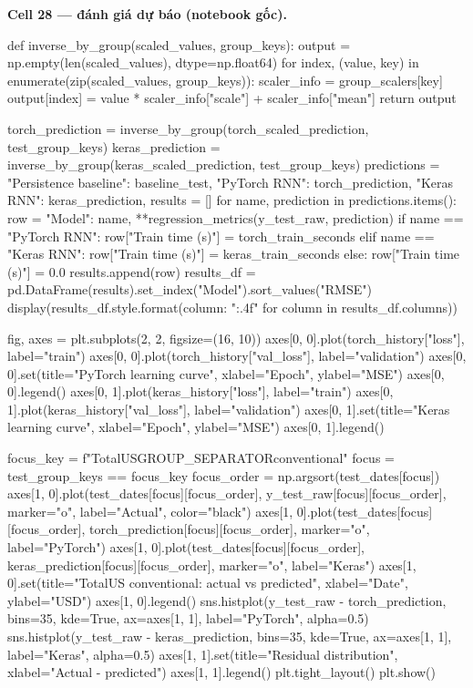 \documentclass[12pt,a4paper]{report}
\begin{document}
\par\medskip\noindent\textbf{Cell 28 --- đánh giá dự báo (notebook gốc).}
\begin{NotebookCode}
def inverse_by_group(scaled_values, group_keys):
    output = np.empty(len(scaled_values), dtype=np.float64)
    for index, (value, key) in enumerate(zip(scaled_values, group_keys)):
        scaler_info = group_scalers[key]
        output[index] = value * scaler_info["scale"] + scaler_info["mean"]
    return output

torch_prediction = inverse_by_group(torch_scaled_prediction, test_group_keys)
keras_prediction = inverse_by_group(keras_scaled_prediction, test_group_keys)
predictions = {
    "Persistence baseline": baseline_test,
    "PyTorch RNN": torch_prediction,
    "Keras RNN": keras_prediction,
}
results = []
for name, prediction in predictions.items():
    row = {"Model": name, **regression_metrics(y_test_raw, prediction)}
    if name == "PyTorch RNN":
        row["Train time (s)"] = torch_train_seconds
    elif name == "Keras RNN":
        row["Train time (s)"] = keras_train_seconds
    else:
        row["Train time (s)"] = 0.0
    results.append(row)
results_df = pd.DataFrame(results).set_index("Model").sort_values("RMSE")
display(results_df.style.format({column: "{:.4f}" for column in results_df.columns}))

fig, axes = plt.subplots(2, 2, figsize=(16, 10))
axes[0, 0].plot(torch_history["loss"], label="train")
axes[0, 0].plot(torch_history["val_loss"], label="validation")
axes[0, 0].set(title="PyTorch learning curve", xlabel="Epoch", ylabel="MSE")
axes[0, 0].legend()
axes[0, 1].plot(keras_history["loss"], label="train")
axes[0, 1].plot(keras_history["val_loss"], label="validation")
axes[0, 1].set(title="Keras learning curve", xlabel="Epoch", ylabel="MSE")
axes[0, 1].legend()

focus_key = f"TotalUS{GROUP_SEPARATOR}conventional"
focus = test_group_keys == focus_key
focus_order = np.argsort(test_dates[focus])
axes[1, 0].plot(test_dates[focus][focus_order], y_test_raw[focus][focus_order], marker="o", label="Actual", color="black")
axes[1, 0].plot(test_dates[focus][focus_order], torch_prediction[focus][focus_order], marker="o", label="PyTorch")
axes[1, 0].plot(test_dates[focus][focus_order], keras_prediction[focus][focus_order], marker="o", label="Keras")
axes[1, 0].set(title="TotalUS conventional: actual vs predicted", xlabel="Date", ylabel="USD")
axes[1, 0].legend()
sns.histplot(y_test_raw - torch_prediction, bins=35, kde=True, ax=axes[1, 1], label="PyTorch", alpha=0.5)
sns.histplot(y_test_raw - keras_prediction, bins=35, kde=True, ax=axes[1, 1], label="Keras", alpha=0.5)
axes[1, 1].set(title="Residual distribution", xlabel="Actual - predicted")
axes[1, 1].legend()
plt.tight_layout()
plt.show()
\end{NotebookCode}
\end{document}
